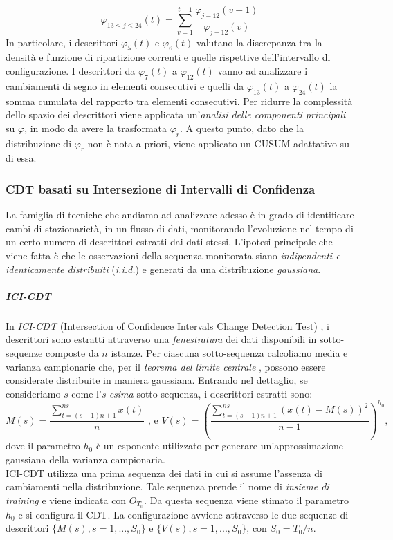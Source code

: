 \[\varphi_{13\leq j\leq 24}(t)=
\sum_{v=1}^{t-1}\frac{\varphi_{j-12}(v+1)}{\varphi_{j-12}(v)} \]
In particolare, i descrittori
$\varphi_5(t)$ e $\varphi_6(t)$
valutano la discrepanza tra la
densit\`a e funzione di ripartizione
correnti e quelle rispettive
dell'intervallo di configurazione. I
descrittori da $\varphi_7(t)$ a
$\varphi_{12}(t)$ vanno ad analizzare
i cambiamenti di segno in elementi
consecutivi e quelli da
$\varphi_{13}(t)$ a $\varphi_{24}(t)$
la somma cumulata del rapporto tra
elementi consecutivi. Per ridurre la
complessit\`a dello spazio dei
descrittori viene applicata
un'\textit{analisi delle componenti
	principali} su $\varphi$, in modo da
avere la trasformata $\varphi_r$. A
questo punto, dato che la
distribuzione di $\varphi_r$ non \`e
nota a priori, viene applicato un
CUSUM adattativo su di essa.
\subsubsection{CDT basati su Intersezione di Intervalli di Confidenza}
La famiglia di tecniche che andiamo ad analizzare adesso \`e in grado di identificare cambi di stazionariet\`a, in un flusso di dati, monitorando l'evoluzione nel tempo di un certo numero di descrittori estratti dai dati stessi.
L'ipotesi principale che viene fatta \`e che le osservazioni della sequenza monitorata siano \textit{indipendenti e identicamente distribuiti} (\textit{i.i.d.}) e generati da una distribuzione \textit{gaussiana}.
\subparagraph{ICI-CDT}
In \textit{ICI-CDT} (Intersection of Confidence Intervals Change Detection Test) \cite{alippi2011just}, i descrittori sono estratti attraverso una \textit{fenestratura} dei dati disponibili in sotto-sequenze composte da $n$ istanze. Per ciascuna sotto-sequenza calcoliamo media e  varianza campionarie che, per il \textit{teorema del limite centrale} \cite{ross2009introduction}, possono essere considerate distribuite in maniera gaussiana. Entrando nel dettaglio, se consideriamo $s$ come l'\textit{s-esima} sotto-sequenza, i descrittori estratti sono:
\[ M(s)=\frac{\sum\limits_{t=(s-1)n+1}^{ns}x(t)}{n} \text{ , e } V(s)=\left(\frac{\sum\limits_{t=(s-1)n+1}^{ns}(x(t)-M(s))^2}{n-1}\right)^{h_0}, \]
dove il parametro $h_0$ \`e un esponente utilizzato per generare un'approssimazione gaussiana della varianza campionaria.\\
ICI-CDT utilizza una prima sequenza dei dati in cui si assume l'assenza di cambiamenti nella distribuzione. Tale sequenza prende il nome di \textit{insieme di training} e viene indicata con $O_{T_0}$. Da questa sequenza viene stimato il parametro $h_0$ e si configura il CDT. La configurazione avviene attraverso le due sequenze di descrittori $\{M(s), s=1,...,S_0\}$ e $\{V(s), s=1,...,S_0\}$, con $S_0=T_0/n$.\\
